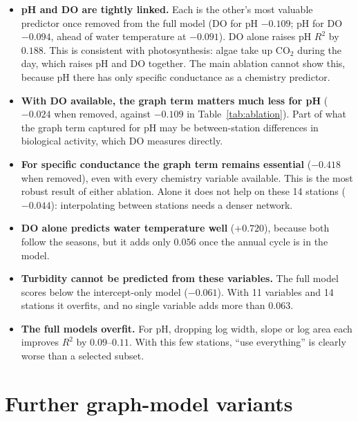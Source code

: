 \documentclass[11pt]{article}
\begin{document}
\begin{itemize}
  \item \textbf{pH and DO are tightly linked.} Each is the other's most valuable predictor once
        removed from the full model (DO for pH $-0.109$; pH for DO $-0.094$, ahead of water
        temperature at $-0.091$). DO alone raises pH $R^2$ by $0.188$. This is consistent with
        photosynthesis: algae take up CO$_2$ during the day, which raises pH and DO together. The main
        ablation cannot show this, because pH there has only specific conductance as a chemistry
        predictor.
  \item \textbf{With DO available, the graph term matters much less for pH} ($-0.024$ when removed,
        against $-0.109$ in Table~\ref{tab:ablation}). Part of what the graph term captured for pH may be
        between-station differences in biological activity, which DO measures directly.
  \item \textbf{For specific conductance the graph term remains essential} ($-0.418$ when removed),
        even with every chemistry variable available. This is the most robust result of either
        ablation. Alone it does not help on these 14 stations ($-0.044$): interpolating between
        stations needs a denser network.
  \item \textbf{DO alone predicts water temperature well} ($+0.720$), because both follow the
        seasons, but it adds only $0.056$ once the annual cycle is in the model.
  \item \textbf{Turbidity cannot be predicted from these variables.} The full model scores below the
        intercept-only model ($-0.061$). With 11 variables and 14 stations it overfits, and no single
        variable adds more than $0.063$.
  \item \textbf{The full models overfit.} For pH, dropping log width, slope or log area each improves
        $R^2$ by $0.09$--$0.11$. With this few stations, ``use everything'' is clearly worse than a
        selected subset.
\end{itemize}

\section{Further graph-model variants}
\label{sec:variants}
\end{document}

